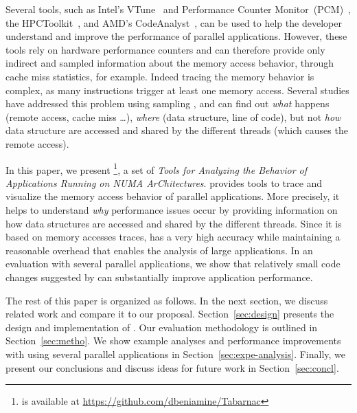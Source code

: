 Several tools, such as Intel's VTune~\cite{Reinders05VTune} and Performance Counter Monitor~(PCM)~\cite{Intel2012b}, the HPCToolkit~\cite{Adhianto10HPCTOOLKIT}, and AMD's CodeAnalyst~\cite{Drongowski2008}, can be used to help the
developer understand and improve the performance of parallel applications.
However, these tools rely on hardware performance counters and can therefore provide only indirect and sampled information about the memory access behavior, through cache miss statistics, for example.
Indeed tracing the memory behavior is complex, as many instructions trigger at least one memory access.
Several studies have addressed this problem using sampling
\cite{Lachaize12MemProf,McCurdy2010,Gimenez14Dissecting},
and can find out \emph{what} happens (remote access, cache miss \ldots),
\emph{where} (data structure, line of code), but not \emph{how} data structure are
accessed and shared by the different threads (which causes the remote access).

In this paper, we present \TABARNAC\footnote{\TABARNAC is available at
    \url{https://github.com/dbeniamine/Tabarnac}}, a set of \emph{Tools for
        Analyzing the Behavior of
Applications Running on NUMA ArChitectures}. \TABARNAC provides tools to trace
and visualize the memory access behavior of parallel
applications. More precisely, it helps to understand \emph{why} performance
issues occur by providing information on how data structures are accessed and
shared by the
different threads.
Since it is based on memory accesses traces, \TABARNAC has a very high
accuracy while maintaining a reasonable overhead that enables the analysis of large applications.
In an evaluation with several parallel applications, we show that relatively small code changes suggested by \TABARNAC can substantially improve application performance.

The rest of this paper is organized as follows.
In the next section, we discuss related work and compare it to our proposal.
Section~\ref{sec:design} presents the design and implementation of \TABARNAC.
Our evaluation methodology is outlined in Section~\ref{sec:metho}.
We show example analyses and performance improvements with \TABARNAC using several parallel applications in Section~\ref{sec:expe-analysis}.
Finally, we present our conclusions and discuss ideas for future work in Section~\ref{sec:concl}.
